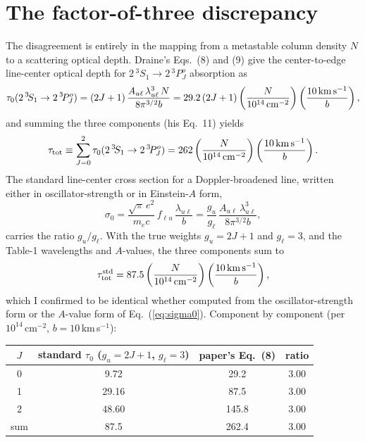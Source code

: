 \documentclass[english,a4paper]{my_memo}
\newcommand{\tSSS}{2\,^3\!S_1}
\newcommand{\tPPP}{2\,^3\!P^o_J}
\newcommand{\tautot}{\tau_{\rm tot}}
\newcommand{\gu}{g_u}
\newcommand{\gl}{g_\ell}
\begin{document}
\section{The factor-of-three discrepancy}
The disagreement is entirely in the mapping from a metastable column
density $N$ to a scattering optical depth.  Draine's Eqs.~(8) and (9)
give the center-to-edge line-center optical depth for
$\tSSS \to \tPPP$ absorption as
\begin{equation}
  \tau_0(\tSSS \to \tPPP)
    = (2J+1)\,\frac{A_{u\ell}\,\lambda_{u\ell}^3\,N}{8\pi^{3/2} b}
    = 29.2\,(2J+1)
      \left(\frac{N}{10^{14}\,{\rm cm^{-2}}}\right)
      \left(\frac{10\,{\rm km\,s^{-1}}}{b}\right),
  \label{eq:draine8}
\end{equation}
and summing the three components (his Eq.~11) yields
\begin{equation}
  \tautot \equiv \sum_{J=0}^{2}\tau_0(\tSSS \to \tPPP)
    = 262
      \left(\frac{N}{10^{14}\,{\rm cm^{-2}}}\right)
      \left(\frac{10\,{\rm km\,s^{-1}}}{b}\right).
  \label{eq:draine11}
\end{equation}
The standard line-center cross section for a Doppler-broadened line,
written either in oscillator-strength or in Einstein-$A$ form,
\begin{equation}
  \sigma_0
    = \frac{\sqrt{\pi}\,e^2}{m_e c}\, f_{\ell u}\,\frac{\lambda_{u\ell}}{b}
    = \frac{\gu}{\gl}\,\frac{A_{u\ell}\,\lambda_{u\ell}^3}{8\pi^{3/2} b},
  \label{eq:sigma0}
\end{equation}
carries the ratio $\gu/\gl$.  With the true weights $\gu = 2J+1$ and
$\gl = 3$, and the Table-1 wavelengths and $A$-values, the three
components sum to
\begin{equation}
  \tautot^{\rm std}
    = 87.5
      \left(\frac{N}{10^{14}\,{\rm cm^{-2}}}\right)
      \left(\frac{10\,{\rm km\,s^{-1}}}{b}\right),
\end{equation}
which I confirmed to be identical whether computed from the
oscillator-strength form or the $A$-value form of Eq.~(\ref{eq:sigma0}).
Component by component (per $10^{14}$\,cm$^{-2}$, $b = 10$\,km\,s$^{-1}$):

\begin{center}
\begin{tabular}{cccc}
\toprule
$J$ & standard $\tau_0$ ($\gu = 2J{+}1$, $\gl = 3$)
    & paper's Eq.~(8)
    & ratio \\
\midrule
0 & \phantom{0}9.72 & \phantom{0}29.2 & 3.00 \\
1 & 29.16           & \phantom{0}87.5 & 3.00 \\
2 & 48.60           & 145.8           & 3.00 \\
\midrule
sum & 87.5 & 262.4 & 3.00 \\
\bottomrule
\end{tabular}
\end{center}
\end{document}
